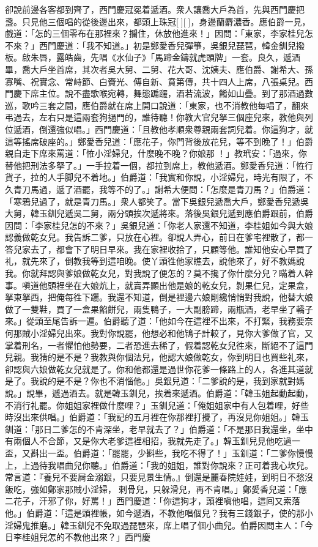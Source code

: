 卻說前邊各客都到齊了，西門慶冠冕着遞酒。衆人讓喬大戶為首，先與西門慶把盞。只見他三個唱的從後邊出來，都頭上珠冠[][]，身邊蘭麝濃香。應伯爵一見，戲道：「怎的三個零布在那裡來？攔住，休放他進來！」因問：「東家，李家桂兒怎不來？」西門慶道：「我不知道。」初是鄭愛香兒彈箏，吳銀兒琵琶，韓金釧兒撥板。啟朱唇，露皓齒，先唱《水仙子》「馬蹄金鑄就虎頭牌」一套。{}良久，遞酒畢，喬大戶坐首席，其次者吳大舅、二舅、花大哥、沈姨夫、應伯爵、謝希大、孫寡嘴、祝實念、常峙節、白賚光、傅自新、賁第傳，共十四人上席，八張桌兒。西門慶下席主位。說不盡歌喉宛轉，舞態蹁躚，酒若流波，餚如山疊。到了那酒過數巡，歌吟三套之間，應伯爵就在席上開口說道：「東家，也不消教他每唱了，翻來弔過去，左右只是這兩套狗撾門的，誰待聽！你教大官兒拏三個座兒來，教他與列位遞酒，倒還強似唱。」西門慶道：「且教他孝順衆尊親兩套詞兒着。你這狗才，就這等搖席破座的。」鄭愛香兒道：「應花子，你門背後放花兒，等不到晚了！」伯爵親自走下席來罵道：「恠小淫婦兒，什麼晚不晚？你娘那𣭈！」教玳安：「過來，你替他把刑法多拏了。」一手拉着一個，都拉到席上，教他遞酒。鄭愛香兒道：「恠行貨子，拉的人手脚兒不着地。」伯爵道：「我實和你說，小淫婦兒，時光有限了，不久青刀馬過，遞了酒罷，我等不的了。」謝希大便問：「怎麼是青刀馬？」伯爵道：「寒鴉兒過了，就是青刀馬。」衆人都笑了。當下吳銀兒遞喬大戶，鄭愛香兒遞吳大舅，韓玉釧兒遞吳二舅，兩分頭挨次遞將來。落後吳銀兒遞到應伯爵跟前，伯爵因問：「李家桂兒怎的不來？」吳銀兒道：「你老人家還不知道，李桂姐如今與大娘認義做乾女兒。我告訴二爹，只放在心裡。卻說人弄心，前日在爹宅裡散了，都一答兒家去了，都會下了明日早來。我在家裡收拾了，只顧等他。誰知他安心早買了礼，就先來了，倒教我等到這咱晚。使丫頭徃他家瞧去，說他來了，好不教媽說我。你就拜認與爹娘做乾女兒，對我說了便怎的？莫不攙了你什麼分兒？瞞着人幹事。嗔道他頭裡坐在大娘炕上，就賣弄顯出他是娘的乾女兒，剝果仁兒，定果盒，拏東拏西，把俺每徃下躧。我還不知道，倒是裡邊六娘剛纔悄悄對我說，他替大娘做了一雙鞋，買了一盒果餡餅兒，兩隻鴨子，一大副膀蹄，兩瓶酒，老早坐了轎子來。」從頭至尾告訴一遍。伯爵聽了道：「他如今在這裡不出來，不打緊，我務要奈何那賊小淫婦兒出來。我對你說罷，他想必和他鴇子計較了，見你大爹做了官，又掌着刑名，一者懼怕他勢要，二者恐進去稀了，假着認乾女兒徃來，斷絕不了這門兒親。我猜的是不是？我教與你個法兒，他認大娘做乾女，你到明日也買些礼來，卻認與六娘做乾女兒就是了。你和他都還是過世你花爹一條路上的人，各進其道就是了。我說的是不是？你也不消惱他。」吳銀兒道：「二爹說的是，我到家就對媽說。」說畢，遞過酒去。就是韓玉釧兒，挨着來遞酒。伯爵道：「韓玉姐起動起動，不消行礼罷。你姐姐家裡做什麼哩？」玉釧兒道：「俺姐姐家中有人包着哩，好些時沒出來供唱。」伯爵道：「我記的五月裡在你那裡打攪了，再沒見你姐姐。」韓玉釧道：「那日二爹怎的不肯深坐，老早就去了？」伯爵道：「不是那日我還坐，坐中有兩個人不合節，又是你大老爹這裡相招，我就先走了。」韓玉釧兒見他吃過一盃，又斟出一盃。伯爵道：「罷罷，少斟些，我吃不得了！」玉釧道：「二爹你慢慢上，上過待我唱曲兒你聽。」伯爵道：「我的姐姐，誰對你說來？正可着我心坎兒。常言道：『養兒不要屙金溺銀，只要見景生情。』倒還是麗春院娃娃，到明日不愁沒飯吃，強如鄭家那賊小淫婦，𢱉剌骨兒，只躲滑兒，再不肯唱。」鄭愛香兒道：「應二花子，汗邪了你，好罵！」西門慶道：「你這狗才，頭裡嗔他唱，這囘又索落他。」伯爵道：「這是頭裡帳，如今遞酒，不教他唱個兒？我有三錢銀子，使的那小淫婦鬼推磨。」韓玉釧兒不免取過琵琶來，席上唱了個小曲兒。伯爵因問主人：「今日李桂姐兒怎的不教他出來？」西門慶